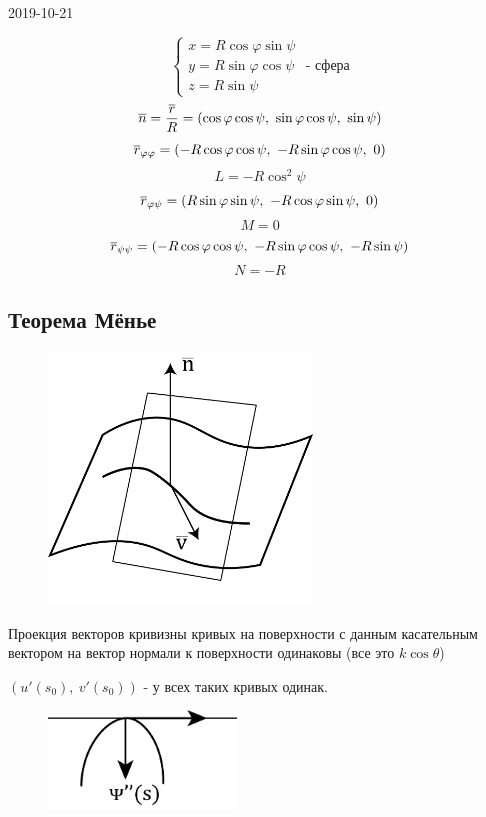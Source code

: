 \documentclass[main]{subfiles}
\begin{document}
\begin{lect} {2019-10-21}
	\begin{Example}
		\[\begin{cases}
			x = R \cos \varphi \sin \psi\\
			y = R \sin \varphi \cos \psi\\
			z = R \sin \psi
		\end{cases} \text{ - сфера}\]
		\[\overline{n} = \dfrac{\overline{r}}{R} = (\cos \varphi \cos \psi,\ \sin \varphi \cos \psi,\ \sin \psi)\]
		\[\overline{r}_{\varphi \varphi} = (-R \cos \varphi \cos \psi,\ -R \sin \varphi \cos \psi,\ 0)\]
		\[L = -R \cos^2 \psi\]
		\[\overline{r}_{\varphi \psi} = (R \sin \varphi \sin \psi,\ -R \cos \varphi \sin \psi,\ 0)\]
		\[M = 0\]
		\[\overline{r}_{\psi \psi} = (-R \cos \varphi \cos \psi,\ -R \sin \varphi \cos \psi,\ -R \sin \psi)\]
		\[N = -R\]
	\end{Example}

	\subsection{Теорема Мёнье}
	\begin{figure}[H]
		\centering
		\includegraphics[width=7cm]{pics/7_7.png}
	\end{figure}
	\begin{theorem}[Мёнье?]
		Проекция векторов кривизны кривых на поверхности с данным касательным вектором на вектор нормали к поверхности одинаковы (все это $k \cos \theta$)
	\end{theorem}
	$(u'(s_0),\ v'(s_0)) \text{ - у всех таких кривых одинак.}$
	\begin{figure}[H]
		\centering
		\includegraphics[width=5cm]{pics/7_8.png}
	\end{figure}


\end{lect}
\end{document}

